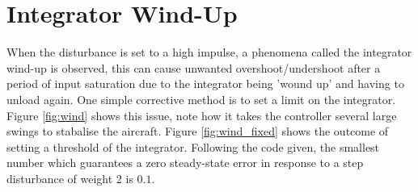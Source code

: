 \documentclass{article}
\begin{document}
\section{Integrator Wind-Up}
When the disturbance is set to a high impulse, a phenomena called the integrator wind-up is observed, this can cause unwanted overshoot/undershoot after a period of input saturation due to the integrator being 'wound up' and having to unload again. One simple corrective method is to set a limit on the integrator. Figure \ref{fig:wind} shows this issue, note how it takes the controller several large swings to stabalise the aircraft. Figure \ref{fig:wind_fixed} shows the outcome of setting a threshold of the integrator. Following the code given, the smallest number which guarantees a zero steady-state error in response to a step disturbance of weight 2 is $0.1$.
\end{document}

